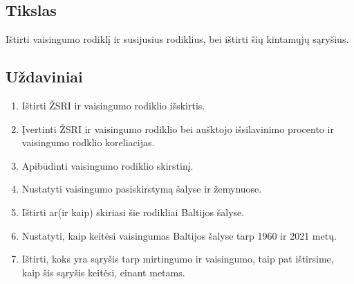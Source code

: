 \subsection{Tikslas} 
Ištirti vaisingumo rodiklį ir susijusius rodiklius, bei ištirti šių kintamųjų sąryšius.

\subsection{Uždaviniai}
\begin{enumerate}
    \item Ištirti ŽSRI ir vaisingumo rodiklio išskirtis.
    \item Įvertinti ŽSRI ir vaisingumo rodiklio bei aušktojo išsilavinimo procento ir vaisingumo rodklio koreliacijas.
    \item Apibūdinti vaisingumo rodiklio skirstinį.
    \item Nustatyti vaisingumo pasiskirstymą šalyse ir žemynuose.
    \item Ištirti ar(ir kaip) skiriasi šie rodikliai Baltijos šalyse.
    \item Nustatyti, kaip keitėsi vaisingumas Baltijos šalyse tarp 1960 ir 2021 metų.
    \item Ištirti, koks yra sąryšis tarp mirtingumo ir vaisingumo, taip pat ištirsime, kaip šis sąryšis keitėsi, einant metams.
\end{enumerate}